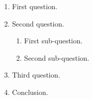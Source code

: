 \documentclass[a4paper, 11pt,
  formal title,
  title in boldface,
  colored solution,
  hide solution,          %
]{homework}
\begin{document}
\begin{problem}
    \leavevmode %
    \begin{enumerate}

        \item
            First question.

            \blindtext

            \begin{solution}
                \blindtext[2]
            \end{solution}

        \item
            Second question.

        \begin{enumerate}
            \item
                First sub-question.

                \blindtext

                \begin{solution}
                    \blindtext[2]
                \end{solution}

            \item
                Second sub-question.

                \blindtext

                \begin{solution}
                    \blindtext[2]
                \end{solution}

        \end{enumerate}

        \item
            Third question.

            \blindtext[2]

            \begin{solution}
                \blindtext[2]
            \end{solution}

        \item
            Conclusion.
            \qedhere

            \begin{solution}
                \blindtext
            \end{solution}

    \end{enumerate}
\end{problem}
\end{document}
